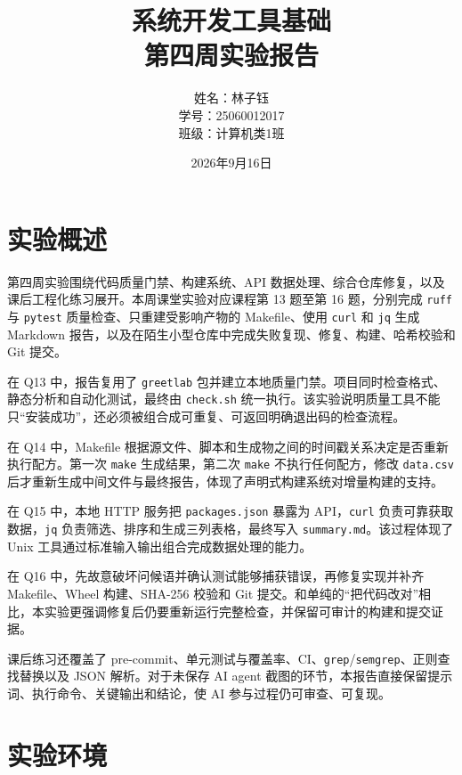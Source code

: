 \documentclass[UTF8,12pt,a4paper]{ctexart}
\title{系统开发工具基础\\第四周实验报告}
\author{姓名：林子钰 \\ 学号：25060012017 \\ 班级：计算机类1班}
\date{2026年9月16日}
\begin{document}
\maketitle
\tableofcontents
\newpage

\section{实验概述}

第四周实验围绕代码质量门禁、构建系统、API 数据处理、综合仓库修复，以及课后工程化练习展开。本周课堂实验对应课程第 13 题至第 16 题，分别完成 \texttt{ruff} 与 \texttt{pytest} 质量检查、只重建受影响产物的 Makefile、使用 \texttt{curl} 和 \texttt{jq} 生成 Markdown 报告，以及在陌生小型仓库中完成失败复现、修复、构建、哈希校验和 Git 提交。

在 Q13 中，报告复用了 \texttt{greetlab} 包并建立本地质量门禁。项目同时检查格式、静态分析和自动化测试，最终由 \texttt{check.sh} 统一执行。该实验说明质量工具不能只“安装成功”，还必须被组合成可重复、可返回明确退出码的检查流程。

在 Q14 中，Makefile 根据源文件、脚本和生成物之间的时间戳关系决定是否重新执行配方。第一次 \texttt{make} 生成结果，第二次 \texttt{make} 不执行任何配方，修改 \texttt{data.csv} 后才重新生成中间文件与最终报告，体现了声明式构建系统对增量构建的支持。

在 Q15 中，本地 HTTP 服务把 \texttt{packages.json} 暴露为 API，\texttt{curl} 负责可靠获取数据，\texttt{jq} 负责筛选、排序和生成三列表格，最终写入 \texttt{summary.md}。该过程体现了 Unix 工具通过标准输入输出组合完成数据处理的能力。

在 Q16 中，先故意破坏问候语并确认测试能够捕获错误，再修复实现并补齐 Makefile、Wheel 构建、SHA-256 校验和 Git 提交。和单纯的“把代码改对”相比，本实验更强调修复后仍要重新运行完整检查，并保留可审计的构建和提交证据。

课后练习还覆盖了 pre-commit、单元测试与覆盖率、CI、\texttt{grep}/\texttt{semgrep}、正则查找替换以及 JSON 解析。对于未保存 AI agent 截图的环节，本报告直接保留提示词、执行命令、关键输出和结论，使 AI 参与过程仍可审查、可复现。

\section{实验环境}
\end{document}
